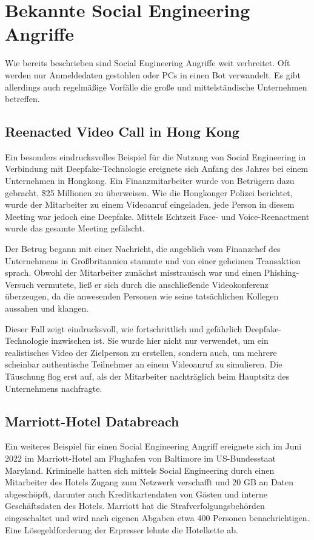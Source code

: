 \section{Bekannte Social Engineering Angriffe}\label{sec:bekannte-social-engineering-angriffe}
Wie bereits beschrieben sind Social Engineering Angriffe weit verbreitet.
Oft werden nur Anmeldedaten gestohlen oder PCs in einen Bot verwandelt.
Es gibt allerdings auch regelmäßige Vorfälle die große und mittelständische Unternehmen betreffen.

\subsection*{Reenacted Video Call in Hong Kong}
Ein besonders eindrucksvolles Beispiel für die Nutzung von Social Engineering in Verbindung mit Deepfake-Technologie
ereignete sich Anfang des Jahres bei einem Unternehmen in Hongkong.
Ein Finanzmitarbeiter wurde von Betrügern dazu gebracht, \$25 Millionen zu überweisen.
Wie die Hongkonger Polizei berichtet, wurde der Mitarbeiter zu einem Videoanruf eingeladen, jede Person in diesem
Meeting war jedoch eine Deepfake. Mittels Echtzeit Face- und Voice-Reenactment wurde das gesamte Meeting gefälscht.

Der Betrug begann mit einer Nachricht, die angeblich vom Finanzchef des Unternehmens in Großbritannien stammte und von einer geheimen Transaktion sprach. Obwohl der Mitarbeiter zunächst misstrauisch war und einen Phishing-Versuch vermutete, ließ er sich durch die anschließende Videokonferenz überzeugen, da die anwesenden Personen wie seine tatsächlichen Kollegen aussahen und klangen.

Dieser Fall zeigt eindrucksvoll, wie fortschrittlich und gefährlich Deepfake-Technologie inzwischen ist. Sie wurde
hier nicht nur verwendet, um ein realistisches Video der Zielperson zu erstellen, sondern auch, um mehrere scheinbar
authentische Teilnehmer an einem Videoanruf zu simulieren. Die Täuschung flog erst auf, als der Mitarbeiter
nachträglich beim Hauptsitz des Unternehmens nachfragte\cite{cnn-deepfake-scam-hong-kong}.

\subsection*{Marriott-Hotel Databreach}
Ein weiteres Beispiel für einen Social Engineering Angriff ereignete sich im Juni 2022 im Marriott-Hotel am Flughafen von Baltimore im US-Bundesstaat Maryland. Kriminelle hatten sich mittels Social Engineering durch einen Mitarbeiter des Hotels Zugang zum Netzwerk verschafft und 20 GB an Daten abgeschöpft, darunter auch Kreditkartendaten von Gästen und interne Geschäftsdaten des Hotels. Marriott hat die Strafverfolgungsbehörden eingeschaltet und wird nach eigenen Abgaben etwa 400 Personen benachrichtigen. Eine Lösegeldforderung der Erpresser lehnte die Hotelkette ab\cite{marriott-data-breach}.


